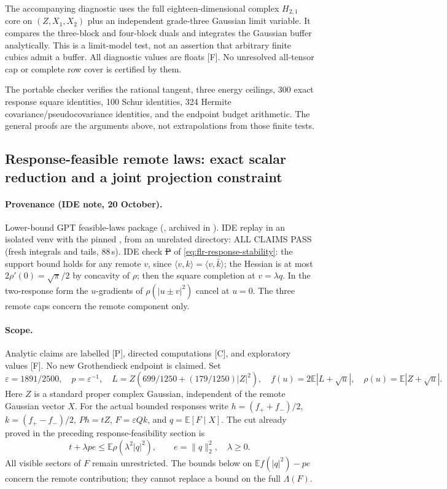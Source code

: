 The accompanying diagnostic uses the full eighteen-dimensional complex
$H_{2,1}$ core on $(Z,X_1,X_2)$ plus an independent grade-three Gaussian
limit variable. It compares the three-block and four-block duals and
integrates the Gaussian buffer analytically. This is a limit-model test,
not an assertion that arbitrary finite cubics admit a buffer.
All diagnostic values are floats [F]. No unresolved all-tensor cap or
complete row cover is certified by them.

The portable checker verifies the rational tangent, three energy ceilings,
300 exact response square identities, 100 Schur identities, 324 Hermite
covariance/pseudocovariance identities, and the endpoint budget arithmetic.
The general proofs are the arguments above, not extrapolations from those
finite tests.

\subsection{Response-feasible remote laws: exact scalar reduction and a joint projection constraint}
\paragraph{Provenance (IDE note, 20 October).} Lower-bound GPT feasible-laws package (, archived in
). IDE replay  in an isolated venv with the pinned , from an unrelated
directory: ALL CLAIMS PASS (fresh integrals and tails, 88\,s). IDE check \st{P} of \eqref{eq:flr-response-stability}: the support bound holds for any remote $v$, since
$\langle v,k\rangle=\langle v,\bar k\rangle$; the Hessian is at most $2\rho'(0)=\sqrt\pi/2$ by concavity of $\rho$; then the square completion at $v=\lambda q$. In the
two-response form the $u$-gradients of $\rho(|u\pm v|^2)$ cancel at $u=0$. The three remote caps concern the remote component only.

\label{sec:response-feasible-law-reduction}
\paragraph{Scope.}
Analytic claims are labelled [P], directed computations [C], and exploratory
values [F]. No new Grothendieck endpoint is claimed. Set
\[
 \varepsilon=1891/2500,\quad p=\varepsilon^{-1},\quad
 L=Z(699/1250+(179/1250)|Z|^2),\quad
 f(u)=2\mathbb E|L+\sqrt u|,\quad \rho(u)=\mathbb E|Z+\sqrt u|.
\]
Here $Z$ is a standard proper complex Gaussian, independent of the remote
Gaussian vector $X$. For the actual bounded responses write
$h=(f_++f_-)/2$, $k=(f_+-f_-)/2$, $Ph=tZ$,
$F=\varepsilon Qk$, and $q=\mathbb E[F\mid X]$.
The cut already proved in the preceding response-feasibility section is
\begin{equation}\label{eq:flr-cut}
 t+\lambda p e\le\mathbb E\rho(\lambda^2|q|^2),\qquad
 e=\|q\|_2^2,\quad \lambda\ge0.
\end{equation}
All visible sectors of $F$ remain unrestricted. The bounds below on
$\mathbb E f(|q|^2)-pe$ concern the remote contribution; they cannot
replace a bound on the full $\Lambda(F)$.

